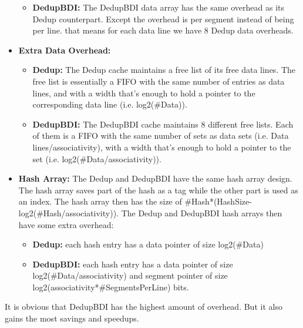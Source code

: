\begin{itemize}
\begin{itemize}
        \item \textbf{DedupBDI:} The DedupBDI data array has the same overhead as its Dedup counterpart. Except the overhead is per segment instead of being per line. that means for each data line we have 8 Dedup data overheads.
    \end{itemize}
    \item \textbf{Extra Data Overhead:}
    \begin{itemize}
        \item \textbf{Dedup:} The Dedup cache maintains a free list of its free data lines. The free list is essentially a FIFO with the same number of entries as data lines, and with a width that's enough to hold a pointer to the corresponding data line (i.e. log2(\#Data)).
        \item \textbf{DedupBDI:} The DedupBDI cache maintains 8 different free lists. Each of them is a FIFO with the same number of sets as data sets (i.e. Data lines/associativity), with a width that's enough to hold a pointer to the set (i.e. log2(\#Data/associativity)).
    \end{itemize}
    \item \textbf{Hash Array:} The Dedup and DedupBDI have the same hash array design. The hash array saves part of the hash as a tag while the other part is used as an index. The hash array then has the size of \#Hash*(HashSize-log2(\#Hash/associativity)). The Dedup and DedupBDI hash arrays then have some extra overhead:
    \begin{itemize}
        \item \textbf{Dedup:} each hash entry has a data pointer of size log2(\#Data)
        \item \textbf{DedupBDI:} each hash entry has a data pointer of size log2(\#Data/associativity) and segment pointer of size log2(associativity*\#SegmentsPerLine) bits.
    \end{itemize}
\end{itemize}
It is obvious that DedupBDI has the highest amount of overhead. But it also gains the most savings and speedups.

